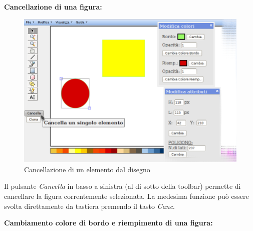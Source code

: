 \newpage
 
 
 
 \textbf{Cancellazione di una figura:}\\
\begin{figure}[!ht]
\centering
\includegraphics[scale=0.5]{images/cancella_elemento.png}
\caption{Cancellazione di un elemento dal disegno}
\end{figure}
 
 
\vspace{50pt}
Il pulsante \textit{Cancella} in basso a sinistra (al di sotto della toolbar) permette di cancellare la figura correntemente selezionata. La medesima funzione pu\`o essere svolta direttamente da tastiera premendo il tasto \textit{Canc}.
\newpage

\textbf{Cambiamento colore di bordo e riempimento di una figura:}\\
 
